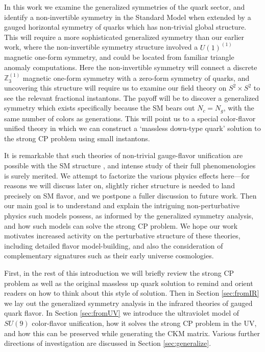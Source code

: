 \documentclass[11pt,a4paper]{article}
\begin{document}
In this work we examine the generalized symmetries of the quark sector, and identify a non-invertible symmetry in the Standard Model when extended by a gauged horizontal symmetry of quarks which has non-trivial global structure.
This will require a more sophisticated generalized symmetry than our earlier work, where the non-invertible symmetry structure involved a $U(1)^{(1)}$ magnetic one-form symmetry, and  could be located from familiar triangle anomaly computations.
Here the non-invertible symmetry will connect a discrete $\mathbb{Z}_3^{(1)}$ magnetic one-form symmetry with a zero-form symmetry of quarks, and uncovering this structure will require us to examine our field theory on $S^2 \times S^2$ to see the relevant fractional instantons.
The payoff will be to discover a generalized symmetry which exists specifically because the SM bears out $N_c = N_g$, with the same number of colors as generations. This will point us to a special color-flavor unified theory in which we can construct a `massless down-type quark' solution to the strong CP problem using small instantons.

It is remarkable that such theories of non-trivial gauge-flavor unification are possible with the SM structure \cite{Allanach:2021bfe}, and intense study of their full phenomenologies is surely merited. We attempt to factorize the various physics effects here---for reasons we will discuss later on, slightly richer structure is needed to land precisely on SM flavor, and we postpone a fuller discussion to future work. Then our main goal is to understand and explain the intriguing non-perturbative physics such models possess, as informed by the generalized symmetry analysis, and how such models can solve the strong CP problem. We hope our work motivates increased activity on the perturbative structure of these theories, including detailed flavor model-building, and also the consideration of complementary signatures such as their early universe cosmologies.

First, in the rest of this introduction we will briefly review the strong CP problem as well as the original massless up quark solution to remind and orient readers on how to think about this style of solution. 
Then in Section \ref{sec:fromIR} we lay out the generalized symmetry analysis in the infrared theories of gauged quark flavor. 
In Section \ref{sec:fromUV} we introduce the ultraviolet model of $SU(9)$ color-flavor unification, how it solves the strong CP problem in the UV, and how this can be preserved while generating the CKM matrix. 
Various further directions of investigation are discussed in Section \ref{sec:generalize}.
\end{document}
